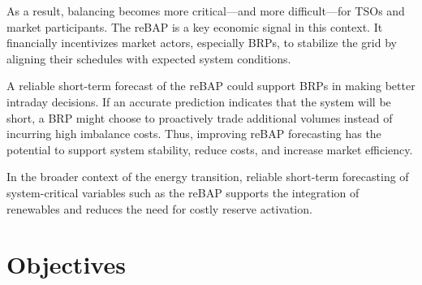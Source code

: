 \documentclass[class=scrbook, crop=false]{standalone}
\begin{document}
As a result, balancing becomes more critical—and more difficult—for \gls{TSO}s and market participants. The \gls{reBAP} is a key economic signal in this context. It financially incentivizes market actors, especially \gls{BRP}s, to stabilize the grid by aligning their schedules with expected system conditions.

A reliable short-term forecast of the \gls{reBAP} could support \gls{BRP}s in making better intraday decisions. If an accurate prediction indicates that the system will be short, a \gls{BRP} might choose to proactively trade additional volumes instead of incurring high imbalance costs. Thus, improving \gls{reBAP} forecasting has the potential to support system stability, reduce costs, and increase market efficiency.

In the broader context of the energy transition, reliable short-term forecasting of system-critical variables such as the \gls{reBAP} supports the integration of renewables and reduces the need for costly reserve activation.

\section{Objectives}
\label{Section::Objectives}




\end{document}
